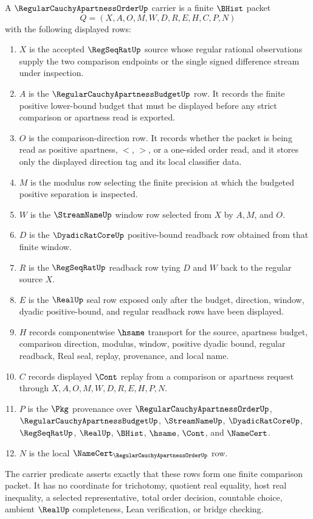 \begin{definition}
\label{def:regular-cauchy-apartness-order-carrier}
A $\RegularCauchyApartnessOrderUp$ carrier is a finite $\BHist$ packet
$$
Q=(X,A,O,M,W,D,R,E,H,C,P,N)
$$
with the following displayed rows:
\begin{enumerate}
\item $X$ is the accepted $\RegSeqRatUp$ source whose regular rational observations supply the two comparison endpoints or the single signed difference stream under inspection.
\item $A$ is the $\RegularCauchyApartnessBudgetUp$ row. It records the finite positive lower-bound budget that must be displayed before any strict comparison or apartness read is exported.
\item $O$ is the comparison-direction row. It records whether the packet is being read as positive apartness, $<$, $>$, or a one-sided order read, and it stores only the displayed direction tag and its local classifier data.
\item $M$ is the modulus row selecting the finite precision at which the budgeted positive separation is inspected.
\item $W$ is the $\StreamNameUp$ window row selected from $X$ by $A,M$, and $O$.
\item $D$ is the $\DyadicRatCoreUp$ positive-bound readback row obtained from that finite window.
\item $R$ is the $\RegSeqRatUp$ readback row tying $D$ and $W$ back to the regular source $X$.
\item $E$ is the $\RealUp$ seal row exposed only after the budget, direction, window, dyadic positive-bound, and regular readback rows have been displayed.
\item $H$ records componentwise $\hsame$ transport for the source, apartness budget, comparison direction, modulus, window, positive dyadic bound, regular readback, Real seal, replay, provenance, and local name.
\item $C$ records displayed $\Cont$ replay from a comparison or apartness request through $X,A,O,M,W,D,R,E,H,P,N$.
\item $P$ is the $\Pkg$ provenance over $\RegularCauchyApartnessOrderUp$, $\RegularCauchyApartnessBudgetUp$, $\StreamNameUp$, $\DyadicRatCoreUp$, $\RegSeqRatUp$, $\RealUp$, $\BHist$, $\hsame$, $\Cont$, and $\NameCert$.
\item $N$ is the local $\NameCert_{\RegularCauchyApartnessOrderUp}$ row.
\end{enumerate}
The carrier predicate asserts exactly that these rows form one finite comparison packet. It has no coordinate for trichotomy, quotient real equality, host real inequality, a selected representative, total order decision, countable choice, ambient $\RealUp$ completeness, Lean verification, or bridge checking.
\end{definition}

